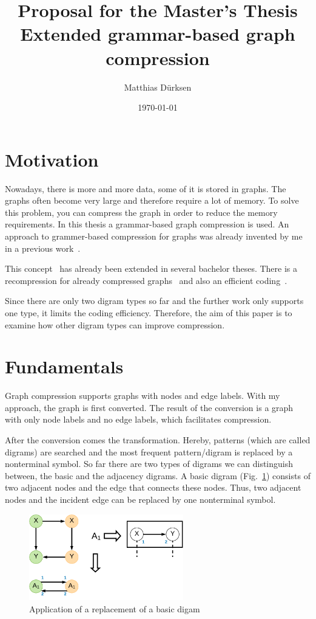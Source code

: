 \documentclass[a4paper]{scrartcl}
\title{Proposal for the Master's Thesis\\Extended grammar-based graph compression}
\author{Matthias Dürksen}
\date{\today}
\begin{document}
\maketitle

\section{Motivation}\label{sec:motivation}

Nowadays, there is more and more data, some of it is stored in graphs. The graphs often become very large and therefore require a lot of memory. To solve this problem, you can compress the graph in order to reduce the memory requirements. In this thesis a grammar-based graph compression is used. An approach to grammer-based compression for graphs was already invented by me in a previous work~\cite{mattdk}.

This concept~\cite{mattdk} has already been extended in several bachelor theses. There is a recompression for already compressed graphs~\cite{werneke} and also an efficient coding~\cite{georgi}. 


Since there are only two digram types so far and the further work only supports one type, it limits the coding efficiency. Therefore, the aim of this paper is to examine how other digram types can improve compression.

\section{Fundamentals}


Graph compression supports graphs with nodes and edge labels. With my approach, the graph is first converted. The result of the conversion is a graph with only node labels and no edge labels, which facilitates compression. 

After the conversion comes the transformation. Hereby, patterns (which are called digrams) are searched and the most frequent pattern/digram is replaced by a nonterminal symbol.
So far there are two types of digrams we can distinguish between, the basic and the adjacency digrams.
A basic digram (Fig.~\ref{fig:basicDigram}) consists of two adjacent nodes and the edge that connects these nodes. Thus, two adjacent nodes and the incident edge can be replaced by one nonterminal symbol.
\begin{figure}[h]
	\centering
	\includegraphics[width=0.6\textwidth]{img/basicDigram}
	\caption{Application of a replacement of a basic digam}
	\label{fig:basicDigram}
\end{figure}
\end{document}
